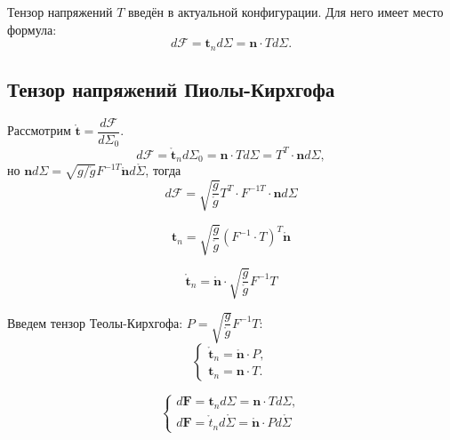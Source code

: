 \begin{remark}
  Тензор напряжений $T$ введён в актуальной конфигурации. Для него имеет место
  формула:
  \[
    d\mathbf{\mathcal{F}} = \mathbf{t}_n d\Sigma = \mathbf{n} \cdot T d\Sigma.
  \]
\end{remark}

\subsection{Тензор напряжений Пиолы-Кирхгофа}

Рассмотрим $\mathring{\mathbf{t}} = \dfrac{d\mathbf{\mathcal{F}}}{d\Sigma_0}$.
\[
  d\mathbf{\mathcal{F}} = \mathring{\mathbf{t}}_n d\Sigma_0
  = \mathbf{n} \cdot T d\Sigma = T^T \cdot \mathbf{n} d\Sigma,
\]
но $\mathbf{n} d\Sigma
= \sqrt{g/\mathring{g}} F^{-1T} \mathring{\mathbf{n}} d\mathring{\Sigma}$, 
тогда
\[
  d\mathbf{\mathcal{F}}
  = \sqrt{\dfrac{g}{\mathring{g}}} T^T \cdot F^{-1T} \cdot \mathbf{n} d\Sigma
\]

\[
  \mathbf{t}_n
  = \sqrt{\dfrac{g}{\mathring{g}}} \left( F^{-1} \cdot T \right)^T \mathring{\mathbf{n}}
\]

\[
  \mathring{\mathbf{t}}_n = \mathbf{\mathring{n}} \cdot \sqrt{\dfrac{g}{\mathring{g}}} F^{-1} T
\]

Введем тензор Теолы-Кирхгофа: $P=\sqrt{\dfrac{g}{\mathring{g}}} F^{-1} T$:
\[
  \begin{cases}
    \mathring{\mathbf{t}}_n = \mathring{\mathbf{n}} \cdot P, \\
    \mathbf{t}_n = \mathbf{n} \cdot T.
  \end{cases}
\]

\[
  \begin{cases}
    d\mathbf{F} = \mathbf{t}_n d\Sigma = \mathbf{n} \cdot T d\Sigma, \\
    d\mathbf{F} = \mathring{t}_n d\mathring{\Sigma} = \mathring{\mathbf{n}} \cdot P d\mathring{\Sigma}
  \end{cases}
  
\]
